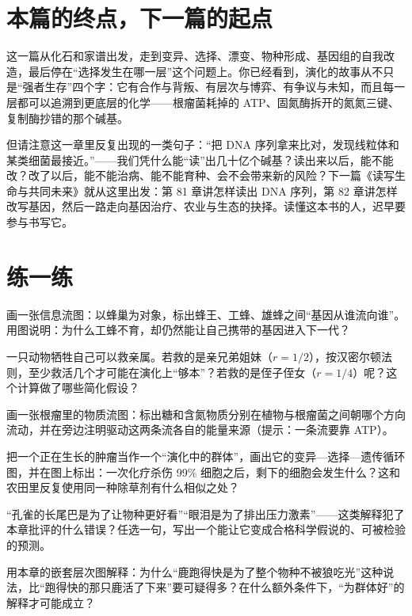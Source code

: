 \section{本篇的终点，下一篇的起点}

这一篇从化石和家谱出发，走到变异、选择、漂变、物种形成、基因组的自我改造，最后停在“选择发生在哪一层”这个问题上。你已经看到，演化的故事从不只是“强者生存”四个字：它有合作与背叛、有层次与博弈、有争议与未知，而且每一层都可以追溯到更底层的化学——根瘤菌耗掉的 ATP、固氮酶拆开的氮氮三键、复制酶抄错的那个碱基。

但请注意这一章里反复出现的一类句子：“把 DNA 序列拿来比对，发现线粒体和某类细菌最接近。”——我们凭什么能“读”出几十亿个碱基？读出来以后，能不能改？改了以后，能不能治病、能不能育种、会不会带来新的风险？下一篇《读写生命与共同未来》就从这里出发：第 81 章讲怎样读出 DNA 序列，第 82 章讲怎样改写基因，然后一路走向基因治疗、农业与生态的抉择。读懂这本书的人，迟早要参与书写它。

\section*{练一练}

\begin{sikaoti}
\item 画一张信息流图：以蜂巢为对象，标出蜂王、工蜂、雄蜂之间“基因从谁流向谁”。用图说明：为什么工蜂不育，却仍然能让自己携带的基因进入下一代？
\item 一只动物牺牲自己可以救亲属。若救的是亲兄弟姐妹（$r=1/2$），按汉密尔顿法则，至少救活几个才可能在演化上“够本”？若救的是侄子侄女（$r=1/4$）呢？这个计算做了哪些简化假设？
\item 画一张根瘤里的物质流图：标出糖和含氮物质分别在植物与根瘤菌之间朝哪个方向流动，并在旁边注明驱动这两条流各自的能量来源（提示：一条流要靠 ATP）。
\item 把一个正在生长的肿瘤当作一个“演化中的群体”，画出它的变异—选择—遗传循环图，并在图上标出：一次化疗杀伤 99\% 细胞之后，剩下的细胞会发生什么？这和农田里反复使用同一种除草剂有什么相似之处？
\item “孔雀的长尾巴是为了让物种更好看”“眼泪是为了排出压力激素”——这类解释犯了本章批评的什么错误？任选一句，写出一个能让它变成合格科学假说的、可被检验的预测。
\item 用本章的嵌套层次图解释：为什么“鹿跑得快是为了整个物种不被狼吃光”这种说法，比“跑得快的那只鹿活了下来”要可疑得多？在什么额外条件下，“为群体好”的解释才可能成立？
\end{sikaoti}
